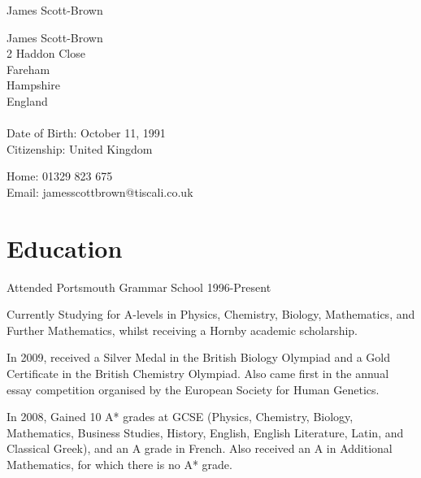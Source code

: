\documentclass[letterpaper]{article}
\def\name{James Scott-Brown}
\renewenvironment{itemize}{
  \begin{list}{}{
    \setlength{\leftmargin}{1.5em}
  }
}{
  \end{list}
}
\begin{document}
{\huge \name}


\vspace{0.25in}

\begin{minipage}[t]{0.5\textwidth}
James Scott-Brown\\
2 Haddon Close\\
Fareham\\
Hampshire\\
England\\ \\
Date of Birth: October 11, 1991 \\
Citizenship: United Kingdom
\end{minipage}
\begin{minipage}[t]{0.5\textwidth}
  Home: 01329 823 675 \\
  Email: jamesscottbrown@tiscali.co.uk \\
\end{minipage}



\section*{Education}
\begin{itemize}
\item Attended Portsmouth Grammar School 1996-Present
 \item Currently Studying for A-levels in Physics, Chemistry, Biology, Mathematics, and Further Mathematics, whilst receiving a Hornby academic scholarship. 
 \item In 2009, received a Silver Medal in the British Biology Olympiad and a Gold Certificate in the British Chemistry Olympiad. Also came first in the annual essay competition organised by the European Society for Human Genetics. 
 \item In 2008, Gained 10 A* grades at GCSE (Physics, Chemistry, Biology, Mathematics, Business Studies, History, English, English Literature, Latin, and Classical Greek), and an A grade in French. Also received an A in Additional Mathematics, for which there is no A* grade.
\end{itemize}
\end{document}
